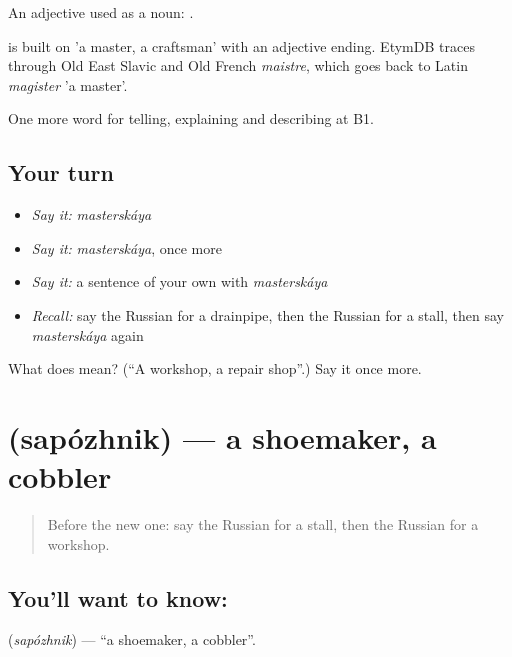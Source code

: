 An adjective used as a noun: \emph{ }.

\begin{cousinweb}
\emph{} is built on \emph{} 'a master, a craftsman' with an adjective ending. EtymDB traces \emph{} through Old East Slavic and Old French \emph{maistre}, which goes back to Latin \emph{magister} 'a master'.
\end{cousinweb}

\begin{grammarlens}[title={What you've built}]
One more word for telling, explaining and describing at B1.
\end{grammarlens}

\subsection*{Your turn}
\begin{itemize}
\raggedright
  \item \emph{Say it:} \emph{masterskáya}
  \item \emph{Say it:} \emph{masterskáya}, once more
  \item \emph{Say it:} a sentence of your own with \emph{masterskáya}
  \item \emph{Recall:} say the Russian for a drainpipe, then the Russian for a stall, then say \emph{masterskáya} again
\end{itemize}

\begin{tcolorbox}[breakable,colback=teal!4,colframe=teal!35!black,title={Before you move on}]
What does  mean? (\textquotedblleft{}A workshop, a repair shop\textquotedblright{}.) Say it once more.
\end{tcolorbox}
\section[\texorpdfstring{\ru{сапожник} (sapózhnik)}{сапожник (sapózhnik)}]{ (sapózhnik) — a shoemaker, a cobbler}

\label{lesson:RU-C447-sapozhnik}



\begin{quote}
Before the new one: say the Russian for a stall, then the Russian for a workshop.
\end{quote}

\subsection*{You'll want to know: }
\textbf{} (\emph{sapózhnik}) — \textquotedblleft{}a shoemaker, a cobbler\textquotedblright{}.

